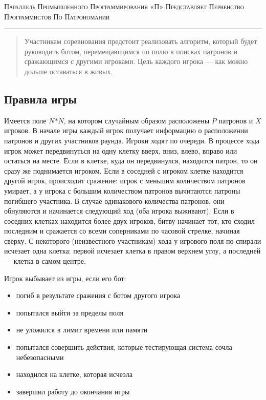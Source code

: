\documentclass[a4paper,12pt]{article}
\begin{document}
\begin{center}
{\small\textsc{Параллель Промышленного Программирования «П» Представляет Первенство Программистов По Патрономании}}
\vskip 1pt \hrule \vskip 3pt

\end{center}
\begin{abstract}
Участникам соревнования предстоит реализовать алгоритм, который будет руководить ботом, перемещающимся по полю в поисках патронов и сражающимся с другими игроками. Цель каждого игрока — как можно дольше оставаться в живых.
\end{abstract}
\subsection{Правила игры}
Имеется поле $N$$*$$N$, на котором случайным образом расположены $P$ патронов и $X$ игроков. В начале игры каждый игрок получает информацию о расположении патронов и других участников раунда. Игроки ходят по очереди. В процессе хода игрок может передвинуться на одну клетку вверх, вниз, влево, вправо или остаться на месте. Если в клетке, куда он передвинулся, находится патрон, то он сразу же поднимается игроком. Если в соседней с игроком клетке находится другой игрок, происходит сражение: игрок с меньшим количеством патронов умирает, а у игрока с большим количеством патронов вычитаются патроны погибшего участника. В случае одинакового количества патронов, они обнуляются и начинается следующий ход (оба игрока выживают). Если в соседних клетках находится более двух игроков, битву начинает тот, кто сходил последним и сражается со всеми соперниками по часовой стрелке, начиная сверху. С некоторого (неизвестного участникам) хода у игрового поля по спирали исчезает одна клетка: первой исчезает клетка в правом верхнем углу, а последней — клетка в самом центре.
\begin{flushleft}
Игрок выбывает из игры, если его бот:
\begin{itemize}
\item погиб в результате сражения с ботом другого игрока
\item попытался выйти за пределы поля
\item не уложился в лимит времени или памяти
\item попытался совершить действия, которые тестирующая система сочла небезопасными
\item находился на клетке, которая исчезла
\item завершил работу до окончания игры
\end{itemize}
\end{flushleft}
\end{document}
